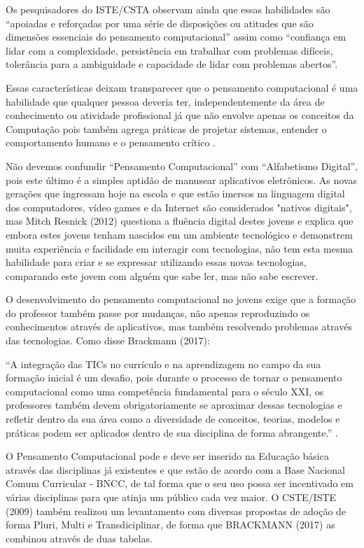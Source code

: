 \documentclass[12pt, openright, a4paper, brazil, english, french, spanish, bibjustif, openany, oneside]{abntex2}
\begin{document}
Os pesquisadores do ISTE/CSTA observam ainda que essas habilidades são ``apoiadas e reforçadas por uma série de disposições ou atitudes que são dimensões essenciais do pensamento computacional'' assim como ``confiança em lidar com a complexidade, persistência em trabalhar com problemas difíceis, tolerância para a ambiguidade e capacidade de lidar com problemas abertos''\cite{iste/csta}.

Essas características deixam transparecer que o pensamento computacional é uma habilidade que qualquer pessoa deveria ter, independentemente da área de conhecimento ou atividade profissional já que não envolve apenas os conceitos da Computação pois também agrega práticas de projetar sistemas, entender o comportamento humano e o pensamento crítico \cite{wing}.

Não devemos confundir ``Pensamento Computacional'' com ``Alfabetismo Digital'', pois este último é a simples aptidão de manusear aplicativos eletrônicos. As novas gerações que ingressam hoje na escola e que estão imersos na linguagem digital dos computadores, vídeo games e da Internet são considerados "nativos digitais", mas Mitch Resnick (2012) questiona a fluência digital destes jovens e explica que embora estes jovens tenham nascidos em um ambiente tecnológico e demonstrem muita experiência e facilidade em interagir com tecnologias, não tem esta mesma habilidade para criar e se expressar utilizando essas novas tecnologias, comparando este jovem com alguém que sabe ler, mas não sabe escrever.

O desenvolvimento do pensamento computacional no jovens exige que a formação do professor também passe por mudanças, não apenas reproduzindo os conhecimentos através de aplicativos, mas também resolvendo problemas através das tecnologias. Como disse Brackmann (2017):

\begin{citacao}

``A integração das TICs no currículo e na aprendizagem no campo da sua formação inicial é um desafio, pois durante o processo de tornar o pensamento computacional como uma competência fundamental para o século XXI, os professores também devem obrigatoriamente se aproximar dessas tecnologias e refletir dentro da sua área como a diversidade de conceitos, teorias, modelos e práticas podem ser aplicados dentro de sua disciplina de forma abrangente.'' \cite{brac}. 

\end{citacao}


O Pensamento Computacional pode e deve ser inserido na Educação básica através das disciplinas já existentes e que estão de acordo com a Base Nacional Comum Curricular - BNCC, de tal forma que o seu uso possa ser incentivado em várias disciplinas para que atinja um público cada vez maior. O CSTE/ISTE (2009) também realizou um levantamento com diversas propostas de adoção de forma Pluri, Multi e Transdiciplinar, de forma que BRACKMANN (2017) as combinou através de duas tabelas.
\end{document}
